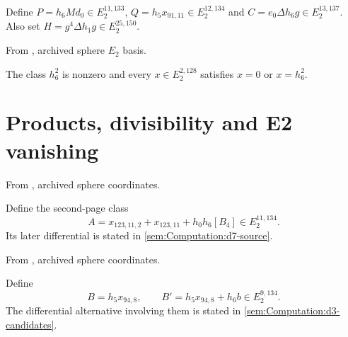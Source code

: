 \begin{definition}
\label{sem:Computation:p-q-correction}
Define $P=h_6Md_0\in E_2^{11,133}$, $Q=h_5x_{91,11}\in E_2^{12,134}$ and $C=e_0\Delta h_6g\in E_2^{13,137}$. Also set $H=g^4\Delta h_1g\in E_2^{25,150}$.
\end{definition}

\begin{theorem}
\label{sem:Computation:square-line}
From \cite{LinProgram}, archived sphere $E_2$ basis.\par
The class $h_6^2$ is nonzero and every $x\in E_2^{2,128}$ satisfies $x=0$ or $x=h_6^2$.
\end{theorem}

\section{Products, divisibility and E2 vanishing}

\begin{definition}
\label{sem:E2Computation:d7-label}
From \cite{LinProgram}, archived sphere coordinates.\par

Define the second-page class
\[A=x_{123,11,2}+x_{123,11}+h_0h_6[B_4]\in E_2^{11,134}.\]
Its later differential is stated in \ref{sem:Computation:d7-source}.
\end{definition}

\begin{definition}
\label{sem:E2Computation:d3-labels}
From \cite{LinProgram}, archived sphere coordinates.\par

Define
\[B=h_5x_{94,8},\qquad B'=h_5x_{94,8}+h_6b\in E_2^{9,134}.\]
The differential alternative involving them is stated in
\ref{sem:Computation:d3-candidates}.
\end{definition}

